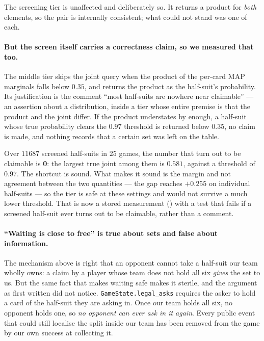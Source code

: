 \documentclass[11pt,a4paper]{article}
\begin{document}
The screening tier is unaffected and deliberately so. It returns a product for
\emph{both} elements, so the pair is internally consistent; what could not
stand was one of each.

\paragraph{But the screen itself carries a correctness claim, so we measured
that too.} The middle tier skips the joint query when the product of the
per-card MAP marginals falls below $0.35$, and returns the product as the
half-suit's probability. Its justification is the comment ``most half-suits are
nowhere near claimable'' --- an assertion about a distribution, inside a tier
whose entire premise is that the product and the joint differ. If the product
understates by enough, a half-suit whose true probability clears the $0.97$
threshold is returned below $0.35$, no claim is made, and nothing records that
a certain set was left on the table.

Over $11687$ screened half-suits in $25$ games, the number that turn out to be
claimable is \textbf{0}: the largest true joint among them is $0.581$, against
a threshold of $0.97$. The shortcut is sound. What makes it sound is the margin and not
agreement between the two quantities --- the gap reaches $+0.255$ on individual
half-suits --- so the tier is safe at these settings and would not survive a
much lower threshold. That is now a stored measurement
() with a test that fails if a
screened half-suit ever turns out to be claimable, rather than a comment.

\paragraph{``Waiting is close to free'' is true about sets and false about
information.} The mechanism above is right that an opponent cannot take a
half-suit our team wholly owns: a claim by a player whose team does not hold
all six \emph{gives} the set to us. But the same fact that makes waiting safe
makes it sterile, and the argument as first written did not notice.
\texttt{GameState.legal\_asks} requires the asker to hold a card of the
half-suit they are asking in. Once our team holds all six, no opponent holds
one, so \emph{no opponent can ever ask in it again}. Every public event that
could still localise the split inside our team has been removed from the game
by our own success at collecting it.
\end{document}
